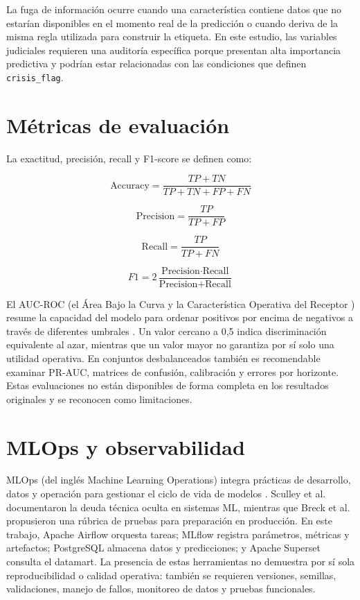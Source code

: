 La fuga de información ocurre cuando una característica contiene datos que no estarían disponibles en el momento real de la predicción o cuando deriva de la misma regla utilizada para construir la etiqueta. En este estudio, las variables judiciales requieren una auditoría específica porque presentan alta importancia predictiva y podrían estar relacionadas con las condiciones que definen \texttt{crisis\_flag}.

\section{Métricas de evaluación}

La exactitud, precisión, recall y F1-score se definen como:

\begin{equation}
\text{Accuracy} = \frac{TP + TN}{TP + TN + FP + FN}
\end{equation}

\begin{equation}
\text{Precision} = \frac{TP}{TP + FP}
\end{equation}

\begin{equation}
\text{Recall} = \frac{TP}{TP + FN}
\end{equation}

\begin{equation}
F1 = 2 \frac{\text{Precision} \cdot \text{Recall}}{\text{Precision} + \text{Recall}}
\end{equation}

El AUC-ROC (el Área Bajo la Curva y la Característica Operativa del Receptor ) resume la capacidad del modelo para ordenar positivos por encima de negativos a través de diferentes umbrales \cite{fawcett2006introduction}. Un valor cercano a 0,5 indica discriminación equivalente al azar, mientras que un valor mayor no garantiza por sí solo una utilidad operativa. En conjuntos desbalanceados también es recomendable examinar PR-AUC, matrices de confusión, calibración y errores por horizonte. Estas evaluaciones no están disponibles de forma completa en los resultados originales y se reconocen como limitaciones.

\section{MLOps y observabilidad}

MLOps (del inglés Machine Learning Operations) integra prácticas de desarrollo, datos y operación para gestionar el ciclo de vida de modelos \cite{testi2022mlops, kreuzberger2023machine}. Sculley et al. \cite{sculley2015hidden} documentaron la deuda técnica oculta en sistemas ML, mientras que Breck et al. \cite{breck2017ml} propusieron una rúbrica de pruebas para preparación en producción. En este trabajo, Apache Airflow orquesta tareas; MLflow registra parámetros, métricas y artefactos; PostgreSQL almacena datos y predicciones; y Apache Superset consulta el datamart. La presencia de estas herramientas no demuestra por sí sola reproducibilidad o calidad operativa: también se requieren versiones, semillas, validaciones, manejo de fallos, monitoreo de datos y pruebas funcionales.